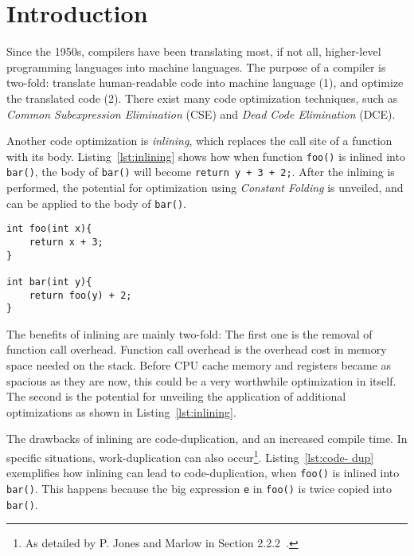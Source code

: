 
\section{Introduction}
\label{introduction}

Since the 1950s, compilers have been translating most, if not all, higher-level
programming languages into machine languages. The purpose of a compiler is
two-fold: translate human-readable code into machine language (1), and optimize
the translated code (2). There exist many code optimization techniques, such as
\textit{Common Subexpression Elimination} (CSE) and \textit{Dead Code
Elimination} (DCE).

Another code optimization is \textit{inlining}, which replaces the call site of
a function with its body. Listing~\ref{lst:inlining} shows how when function
\lstinline!foo()! is inlined into \lstinline!bar()!, the body of
\lstinline!bar()! will become \lstinline!return y + 3 + 2;!. After the inlining
is performed, the potential for optimization using \textit{Constant Folding} is
unveiled, and can be applied to the body of \lstinline!bar()!.

\begin{lstlisting}[label={lst:inlining}, style=global_customcpp,
caption={Function \lstinline!foo()! inlined into function \lstinline!bar()!.}]
int foo(int x){
	return x + 3;
}

int bar(int y){
	return foo(y) + 2;
}
\end{lstlisting}
\vspace{-3\parskip} %

The benefits of inlining are mainly two-fold: The first one is the removal of
function call overhead. Function call overhead is the overhead cost in memory
space needed on the stack. Before CPU cache memory and registers became as
spacious as they are now, this could be a very worthwhile optimization in
itself. The second is the potential for unveiling the application of additional
optimizations as shown in Listing~\ref{lst:inlining}.

The drawbacks of inlining are code-duplication, and an increased compile time.
In specific situations, work-duplication can also occur\footnote{As detailed by
P. Jones and Marlow in Section 2.2.2~\cite{GHCPaper}.}. Listing~\ref{lst:code-
dup} exemplifies how inlining can lead to code-duplication, when
\lstinline!foo()! is inlined into \lstinline!bar()!. This happens because the
big expression \lstinline!e! in \lstinline!foo()! is twice copied into
\lstinline!bar()!.

